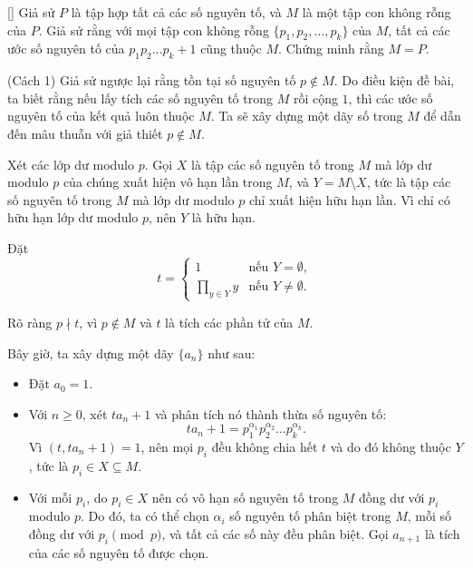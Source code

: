 \documentclass[../09-contruction-methods.tex]{subfiles}
\begin{document}
\begin{example*}\label{example:USA-2015-TSTST-P3}[\textbf{}]
	Giả sử $P$ là tập hợp tất cả các số nguyên tố, và $M$ là một tập con không rỗng của $P$.
	Giả sử rằng với mọi tập con không rỗng $\{p_1, p_2, \ldots, p_k\}$ của $M$, tất cả các ước số nguyên tố của $p_1p_2\ldots p_k + 1$ cũng thuộc $M$.
	Chứng minh rằng $M = P$.
\end{example*}

\begin{soln}(Cách 1)\footnotemark
	Giả sử ngược lại rằng tồn tại số nguyên tố $p \notin M$.
	Do điều kiện đề bài, ta biết rằng nếu lấy tích các số nguyên tố trong $M$ rồi cộng $1$, thì các ước số nguyên tố của kết quả luôn thuộc $M$.
	Ta sẽ xây dựng một dãy số trong $M$ để dẫn đến mâu thuẫn với giả thiết $p \notin M$.
	
	Xét các lớp dư modulo $p$. Gọi $X$ là tập các số nguyên tố trong $M$ mà lớp dư modulo $p$ của chúng xuất hiện vô hạn lần trong $M$,
	và $Y = M \setminus X$, tức là tập các số nguyên tố trong $M$ mà lớp dư modulo $p$ chỉ xuất hiện hữu hạn lần.
	Vì chỉ có hữu hạn lớp dư modulo $p$, nên $Y$ là hữu hạn.
	
	Đặt 
	\[
		t = 
		\begin{cases}
			1 & \text{nếu } Y = \emptyset, \\
			\prod\limits_{y \in Y} y & \text{nếu } Y \neq \emptyset.
		\end{cases}
	\]
	
	Rõ ràng $p \nmid t$, vì $p \notin M$ và $t$ là tích các phần tử của $M$.
	
	Bây giờ, ta xây dựng một dãy $\{a_n\}$ như sau:
	
	\begin{itemize}[topsep=0pt, partopsep=0pt, itemsep=0pt]
		\item Đặt $a_0 = 1$.
		\item Với $n \ge 0$, xét $ta_n + 1$ và phân tích nó thành thừa số nguyên tố:
	  	\[
	  		ta_n + 1 = p_1^{\alpha_1} p_2^{\alpha_2} \ldots p_k^{\alpha_k}.
	  	\]
		Vì $(t, ta_n + 1) = 1$, nên mọi $p_i$ đều không chia hết $t$ và do đó không thuộc $Y$, tức là $p_i \in X \subseteq M$.
	  	\item Với mỗi $p_i$, do $p_i \in X$ nên có vô hạn số nguyên tố trong $M$ đồng dư với $p_i$ modulo $p$.
		Do đó, ta có thể chọn $\alpha_i$ số nguyên tố phân biệt trong $M$, mỗi số đồng dư với $p_i \pmod{p}$, và tất cả các số này đều phân biệt.
		Gọi $a_{n+1}$ là tích của các số nguyên tố được chọn.
	\end{itemize}
	

\end{soln}
\end{document}
